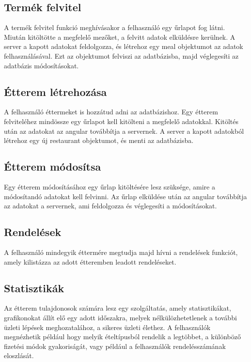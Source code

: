 \subsection{Termék felvitel}

A termék felvitel funkció meghívásakor a felhasználó egy űrlapot fog látni. Miután kitöltötte a megfelelő mezőket, a felvitt adatok elküldésre kerülnek. A server a kapott adatokat feldolgozza, és létrehoz egy meal objektumot az adatok felhasználásával. Ezt az objektumot felviszi az adatbázisba, majd véglegesíti az adatbázis módosításokat.

\subsection{Étterem létrehozása}

A felhasználó éttermeket is hozzátud adni az adatbázishoz. Egy étterem felviteléhez mindössze egy űrlapot kell kitölteni a megfelelő adatokkal. Kitöltés után az adatokat az angular továbbítja a servernek. A server a kapott adatokból létrehoz egy új restaurant objektumot, és menti az adatbázisba.

\subsection{Étterem módosítsa}

Egy étterem módosításához egy űrlap kitöltésére lesz szüksége, amire a módosítandó adatokat kell felvinni. Az űrlap elküldése után az angular továbbítja az adatokat a servernek, ami feldolgozza és véglegesíti a módosításokat.

\subsection{Rendelések}

A felhasználó mindegyik éttermére megtudja majd hívni a rendelések funkciót, amely kilistázza az adott étteremben leadott rendeléseket.

\subsection{Statisztikák}

Az étterem tulajdonosok számára lesz egy szolgáltatás, amely statisztikákat, grafikonokat állít elő egy adott időszakra, melyek nélkülözhetetlenek a további üzleti lépések meghozatalához, a sikeres üzleti élethez. A felhasználók megnézhetik például hogy melyik ételtípusból rendelik a legtöbbet, a különböző fizetési módok gyakoriságát, vagy például a felhasználók rendelésszámának eloszlását.

